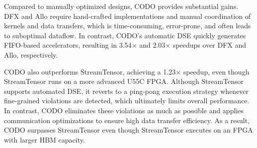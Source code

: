 \documentclass[conference]{IEEEtran}
\begin{document}
Compared to manually optimized designs, CODO provides substantial gains. DFX and Allo require hand-crafted implementations and manual coordination of kernels and data transfers, which is time-consuming, error-prone, and often leads to suboptimal dataflow. In contrast, CODO's automatic DSE quickly generates FIFO-based accelerators, resulting in 3.54$\times$ and 2.03$\times$ speedups over DFX and Allo, respectively.

CODO also outperforms StreamTensor, achieving a 1.23$\times$ speedup, even though StreamTensor runs on a more advanced U55C FPGA.
Although StreamTensor supports automated DSE, it reverts to a ping-pong execution strategy whenever fine-grained violations are detected, which ultimately limits overall performance. In contrast, CODO eliminates these violations as much as possible and applies communication optimizations to ensure high data transfer efficiency. As a result, CODO surpasses StreamTensor even though StreamTensor executes on an FPGA with larger HBM capacity.


\end{document}
